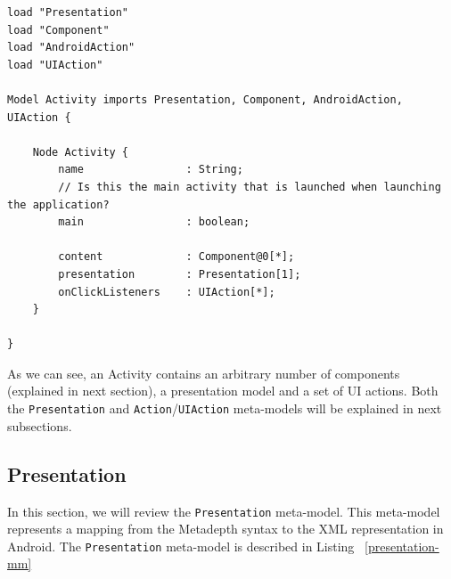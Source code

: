 \begin{lstlisting}[label=activity-mm,caption=Activity meta-model, captionpos=t]
load "Presentation"
load "Component"
load "AndroidAction"
load "UIAction"

Model Activity imports Presentation, Component, AndroidAction, UIAction {

	Node Activity {
		name				: String;
		// Is this the main activity that is launched when launching the application?
		main 				: boolean;

		content				: Component@0[*];
		presentation		: Presentation[1];
		onClickListeners 	: UIAction[*];
	}

}
\end{lstlisting}
As we can see, an Activity contains an arbitrary number of components (explained in next section), a presentation model and a set of UI actions. Both the \texttt{Presentation} and \texttt{Action}/\texttt{UIAction} meta-models will be explained in next subsections.

\subsection{Presentation}

In this section, we will review the \texttt{Presentation} meta-model. This meta-model represents a mapping from the Metadepth syntax to the XML representation in Android. The \texttt{Presentation} meta-model is described in Listing ~\ref{presentation-mm}

